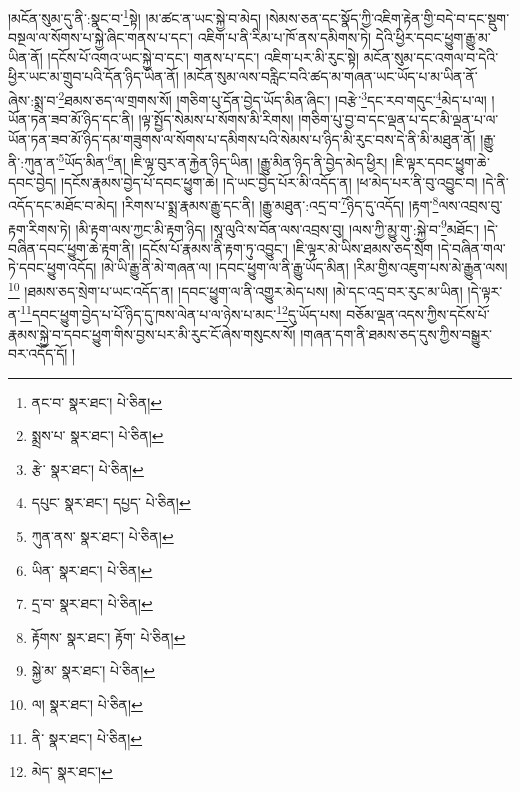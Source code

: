 །མངོན་སུམ་དུ་ནི་:སྣང་བ་\footnote{ནང་བ་  སྣར་ཐང་།  པེ་ཅིན། }སྟེ། །མ་ཚང་ན་ཡང་སྐྱེ་བ་མེད། །སེམས་ཅན་དང་སྣོད་ཀྱི་འཇིག་རྟེན་གྱི་བདེ་བ་དང་སྡུག་བསྔལ་ལ་སོགས་པ་སྐྱེ་ཞིང་གནས་པ་དང་། འཇིག་པ་ནི་རིམ་པ་ཁོ་ནས་དམིགས་ཏེ། དེའི་ཕྱིར་དབང་ཕྱུག་རྒྱུ་མ་ཡིན་ནོ། །དངོས་པོ་འགའ་ཡང་སྐྱེ་བ་དང་། གནས་པ་དང་། འཇིག་པར་མི་རུང་སྟེ། མངོན་སུམ་དང་འགལ་བ་དེའི་ཕྱིར་ཡང་མ་གྲུབ་པའི་དོན་ཉིད་ཡིན་ནོ། །མངོན་སུམ་ལས་བརླིང་བའི་ཚད་མ་གཞན་ཡང་ཡོད་པ་མ་ཡིན་ནོ་ཞེས་:སྨྲ་བ་\footnote{སྨྲས་པ་  སྣར་ཐང་།  པེ་ཅིན། }ཐམས་ཅད་ལ་གྲགས་སོ། །གཅིག་པུ་དོན་བྱེད་ཡོད་མིན་ཞིང་། །བརྩེ་\footnote{རྩེ་  སྣར་ཐང་།  པེ་ཅིན། }དང་རབ་གདུང་\footnote{དཔུང་  སྣར་ཐང་། དཔྱད་  པེ་ཅིན། }མེད་པ་ལ། །ཡོན་ཏན་ཟབ་མོ་ཉིད་དང་ནི། །ལྟ་སྤྱོད་སེམས་པ་སོགས་མི་རིགས། །གཅིག་པུ་བྱ་བ་དང་ལྡན་པ་དང་མི་ལྡན་པ་ལ་ཡོན་ཏན་ཟབ་མོ་ཉིད་དམ་གཟུགས་ལ་སོགས་པ་དམིགས་པའི་སེམས་པ་ཉིད་མི་རུང་བས་དེ་ནི་མི་མཐུན་ནོ། །རྒྱུ་ནི་:ཀུན་ན་\footnote{ཀུན་ནས་  སྣར་ཐང་།  པེ་ཅིན། }ཡོད་མིན་\footnote{ཡིན་  སྣར་ཐང་།  པེ་ཅིན། }ན། །ཇི་ལྟ་བུར་ན་རྐྱེན་ཉིད་ཡིན། །རྒྱུ་མིན་ཉིད་ནི་བྱེད་མེད་ཕྱིར། །ཇི་ལྟར་དབང་ཕྱུག་ཆེ་དབང་བྱེད། །དངོས་རྣམས་བྱེད་པོ་དབང་ཕྱུག་ཆེ། །དེ་ཡང་བྱེད་པོར་མི་འདོད་ན། །ཕ་མེད་པར་ནི་བུ་འབྱུང་བ། །དེ་ནི་འདོད་དང་མཐོང་བ་མེད། །རིགས་པ་སྨྲ་རྣམས་རྒྱུ་དང་ནི། །རྒྱུ་མཐུན་:འདྲ་བ་\footnote{དྲ་བ་  སྣར་ཐང་།  པེ་ཅིན། }ཉིད་དུ་འདོད། །རྟག་\footnote{རྟོགས་  སྣར་ཐང་། རྟོག་  པེ་ཅིན། }ལས་འབྲས་བུ་རྟག་རིགས་ཏེ། །མི་རྟག་ལས་ཀྱང་མི་རྟག་ཉིད། །སཱ་ལུའི་ས་བོན་ལས་འབྲས་བུ། །ལས་ཀྱི་མྱུ་གུ་:སྐྱེ་བ་\footnote{སྐྱེ་མ་  སྣར་ཐང་།  པེ་ཅིན། }མཐོང་། །དེ་བཞིན་དབང་ཕྱུག་ཆེ་རྟག་ནི། །དངོས་པོ་རྣམས་ནི་རྟག་ཏུ་འབྱུང་། །ཇི་ལྟར་མེ་ཡིས་ཐམས་ཅད་སྲེག །དེ་བཞིན་གལ་ཏེ་དབང་ཕྱུག་འདོད། །མེ་ཡི་རྒྱུ་ནི་མེ་གཞན་ལ། །དབང་ཕྱུག་ལ་ནི་རྒྱུ་ཡོད་མིན། །རིམ་གྱིས་འཇུག་པས་མེ་རྒྱུན་ལས།\footnote{ལ།  སྣར་ཐང་།  པེ་ཅིན། } །ཐམས་ཅད་སྲེག་པ་ཡང་འདོད་ན། །དབང་ཕྱུག་ལ་ནི་འགྱུར་མེད་པས། །མེ་དང་འདྲ་བར་རུང་མ་ཡིན། །དེ་ལྟར་ན་\footnote{ནི་  སྣར་ཐང་།  པེ་ཅིན། }དབང་ཕྱུག་བྱེད་པ་པོ་ཉིད་དུ་ཁས་ལེན་པ་ལ་ཉེས་པ་མང་\footnote{མེད་  སྣར་ཐང་། }དུ་ཡོད་པས། བཅོམ་ལྡན་འདས་ཀྱིས་དངོས་པོ་རྣམས་སྐྱེ་བ་དབང་ཕྱུག་གིས་བྱས་པར་མི་རུང་ངོ་ཞེས་གསུངས་སོ། །གཞན་དག་ནི་ཐམས་ཅད་དུས་ཀྱིས་བསྒྱུར་བར་འདོད་དོ། །
